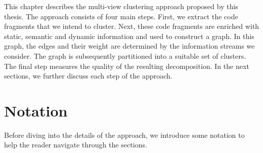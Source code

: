This chapter describes the multi-view clustering approach proposed by this thesis. The approach consists of four main steps. First, we extract the code fragments that we intend to cluster. Next, these code fragments are enriched with static, semantic and dynamic information and used to construct a graph. In this graph, the edges and their weight are determined by the information streams we consider. The graph is subsequently partitioned into a suitable set of clusters. The final step measures the quality of the resulting decomposition. In the next sections, we further discuss each step of the approach.

\section{Notation}
Before diving into the details of the approach, we introduce some notation to help the reader navigate through the sections. \par

